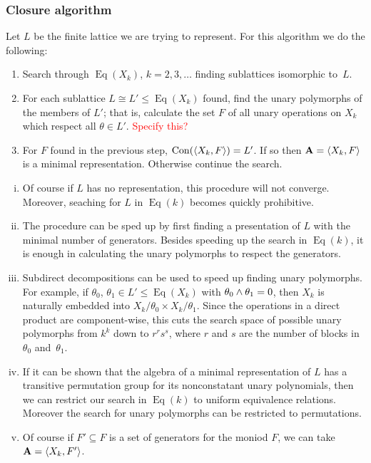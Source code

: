 {\subsubsection{Closure algorithm}\label{sec:closure-method}
Let $L$ be the finite lattice we are trying to represent. For this
algorithm we do the following:
\begin{enumerate}
\item
Search through $\operatorname{Eq}(X_k)$, $k = 2,3, \ldots$ finding
sublattices isomorphic to~$L$. 
\item
For each sublattice $L \cong L' \le \operatorname{Eq}(X_k)$ found, 
find the unary polymorphs of the members of $L'$; that is,
calculate the set $F$ of all unary operations on $X_k$
which respect all $\theta \in L'$.
\textcolor{red}{Specify this?}
\item
For $F$ found in the previous step, 
$\operatorname{Con}(\langle X_k,F \rangle) = L'$. 
If so then $\mathbf{A} = \langle X_k,F \rangle$ is a minimal 
representation. Otherwise continue the search.
\end{enumerate}

\begin{remarks}
\begin{enumerate}[i.]
\item
Of course if $L$ has no representation, this procedure will not converge.
Moreover, seaching for $L$ in $\operatorname{Eq}(k)$
becomes quickly prohibitive. 
\item
The procedure can be sped up by first finding a presentation
of $L$ with the minimal number of generators. Besides speeding
up the search in $\operatorname{Eq}(k)$, it is enough in 
calculating the unary polymorphs to respect the generators.
\item
Subdirect decompositions can be used to speed up finding unary
polymorphs. For  example, if $\theta_0$, $\theta_1 \in L' \le 
\operatorname{Eq}(X_k)$ with $\theta_0 \wedge \theta_1 = 0$, 
then $X_k$ is naturally embedded into 
$X_k/\theta_0 \times X_k/\theta_1$. Since the operations in a
direct product are component-wise, this 
cuts the search space of possible unary polymorphs 
from $k^k$ down to $r^r  s^s$, where $r$ and $s$ are the number 
of blocks in $\theta_0$ and~$\theta_1$.
\item
If it can be shown that the algebra of a minimal representation 
of $L$ has a transitive permutation group for its nonconstatant
unary polynomials, then we can restrict our search in 
$\operatorname{Eq}(k)$ to uniform equivalence relations.
Moreover the search for unary polymorphs can be restricted
to permutations. 
\item
Of course if $F' \subseteq F$ is a set of generators for the 
moniod $F$, we can take $\mathbf{A} = \langle X_k,F' \rangle$.
\end{enumerate}
\end{remarks}


}
